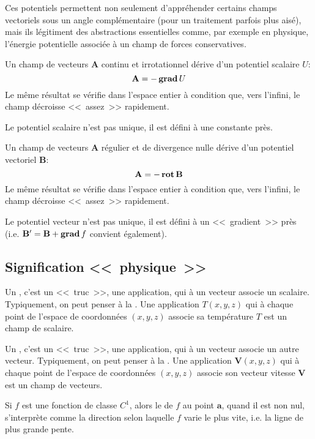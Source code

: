 \ifVersionDuDocEstVincent\medskip\fi
Ces potentiels permettent non seulement d'appréhender certains champs vectoriels sous un angle
complémentaire (pour un traitement parfois plus aisé), mais ils légitiment des abstractions essentielles
comme, par exemple en physique, l'énergie potentielle associée à un champ de forces conservatives.

\ifVersionDuDocEstVincent\medskip\fi
Un champ de vecteurs $\mathbf{A} $ continu et irrotationnel dérive d'un potentiel scalaire $U$:
\begin{equation}
 \mathbf{A} = -\operatorname{\mathbf{grad}} U
\end{equation}
Le même résultat se vérifie dans l'espace entier à condition que, vers l'infini, le champ
décroisse <<~assez~>> rapidement.

Le potentiel scalaire n'est pas unique, il est défini à une constante près.

\ifVersionDuDocEstVincent\medskip\fi
Un champ de vecteurs $\mathbf{A} $ régulier et de divergence nulle dérive d'un potentiel vectoriel
$\mathbf{B} $:
\begin{equation}
    \mathbf{A}  = -\operatorname{\mathbf{rot}} \mathbf{B}
\end{equation}
Le même résultat se vérifie dans l'espace entier à condition que, vers l'infini, le champ
décroisse <<~assez~>> rapidement.

Le potentiel vecteur n'est pas unique, il est défini à un <<~gradient~>> près (i.e.
$ \mathbf{B} ' =  \mathbf{B}  + \operatorname{\mathbf{grad}}  f$ convient
également).

\ifVersionDuDocEstVincent\medskip\fi
\subsection{Signification <<~physique~>>}

Un , c'est un <<~truc~>>, une application, qui à un vecteur
associe un scalaire. Typiquement, on peut penser à la .
Une application $T(x,y,z)$ qui à chaque point de l'espace de coordonnées $(x,y,z)$ associe
sa température $T$ est un champ de scalaire.

Un , c'est un <<~truc~>>, une application, qui à un vecteur
associe un autre vecteur. Typiquement, on peut penser à la .
Une application $\mathbf{V}(x,y,z)$ qui à chaque point de l'espace de coordonnées $(x,y,z)$
associe son vecteur vitesse $\mathbf{V}$ est un champ de vecteurs.

\ifVersionDuDocEstVincent\medskip\fi
Si $f$ est une fonction de classe $C^1$, alors le  de $f$ au point $\mathbf{a}$,
quand il est non nul, s'interprète comme la direction selon laquelle $f$ varie le plus vite,
i.e. la ligne de plus grande pente.

